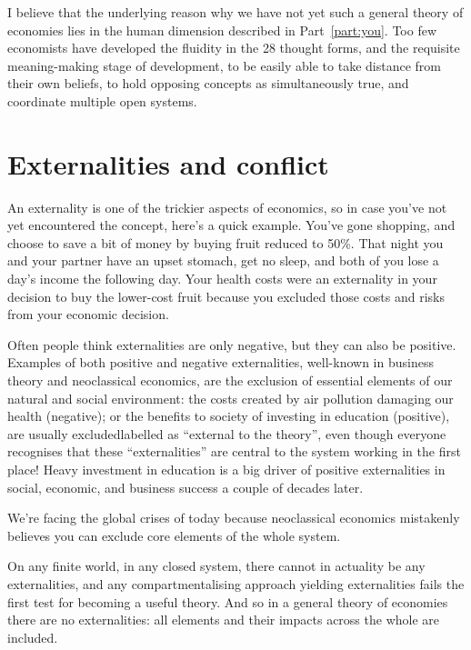 I believe that the underlying reason why we have not yet such a general theory of economies lies in the human dimension described in Part~\ref{part:you}. Too few economists have developed the fluidity in the 28 thought forms,  and the requisite meaning-making stage of development, to be easily able to take distance from their own beliefs, to hold opposing concepts as simultaneously true, and coordinate multiple open systems. 




\section{Externalities and conflict}
An externality is one of the trickier aspects of economics,   so in case you’ve not yet encountered the concept, here’s a quick example. You’ve gone shopping, and choose to save a bit of money by buying fruit reduced to 50\%. That night you and your partner have an upset stomach, get no sleep, and both of you lose a day’s income the following day. Your health costs were an externality in your decision to buy the lower-cost fruit because you excluded those costs and risks from your economic decision. 


Often people think externalities are only negative, but they can also be positive.  Examples of both positive and negative externalities, well-known in business theory and neoclassical economics,  are the exclusion of essential elements of our natural and social environment: the costs created by air pollution damaging our health (negative); or the benefits to society of investing in education (positive), are usually excluded\textemdash labelled as “external to the theory”, even though everyone recognises that these “externalities” are central to the system working in the first place! Heavy investment in education is a big driver of positive externalities in social, economic, and business success a couple of decades later.


We’re facing the global crises of today because neoclassical economics mistakenly believes you can exclude core elements of the whole system. 


On any finite world, in any closed system, there cannot in actuality be any externalities, and any compartmentalising approach yielding externalities fails the first test for becoming a useful theory. And so in a general theory of economies there are no externalities: all elements and their impacts across the whole are included.


